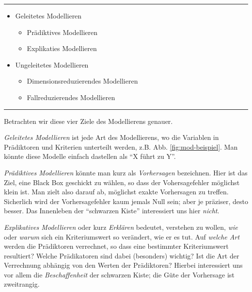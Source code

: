 \documentclass[12pt,ngerman,]{book}
\providecommand{\tightlist}{%
  \setlength{\itemsep}{0pt}\setlength{\parskip}{0pt}}
\theoremstyle{definition}
\theoremstyle{definition}
\theoremstyle{remark}
\begin{document}
\begin{center}\rule{0.5\linewidth}{\linethickness}\end{center}

\begin{itemize}
\tightlist
\item
  Geleitetes Modellieren

  \begin{itemize}
  \tightlist
  \item
    Prädiktives Modellieren
  \item
    Explikaties Modellieren
  \end{itemize}
\item
  Ungeleitetes Modellieren

  \begin{itemize}
  \tightlist
  \item
    Dimensionsreduzierendes Modellieren
  \item
    Fallreduzierendes Modellieren
  \end{itemize}
\end{itemize}

\begin{center}\rule{0.5\linewidth}{\linethickness}\end{center}

Betrachten wir diese vier Ziele des Modellierens genauer.

\emph{Geleitetes Modellieren} ist jede Art
des Modellierens, wo die Variablen in Prädiktoren und Kriterien
unterteilt werden, z.B. Abb. \ref{fig:mod-beispiel}. Man könnte diese
Modelle einfach dastellen als ``X führt zu Y''.

\emph{Prädiktives Modellieren} könnte man
kurz als \emph{Vorhersagen} bezeichnen. Hier ist das
Ziel, eine Black Box geschickt zu wählen, so dass der Vohersagefehler
möglichst klein ist. Man zielt also darauf ab, möglichst exakte
Vorhersagen zu treffen. Sicherlich wird der Vorhersagefehler kaum jemals
Null sein; aber je präziser, desto besser. Das Innenleben der
``schwarzen Kiste'' interessiert uns hier \emph{nicht}.

\emph{Explikatives Modellieren} oder
kurz \emph{Erklären} bedeutet, verstehen zu wollen,
\emph{wie} oder \emph{warum} sich ein Kriteriumswert so verändert, wie
er es tut. Auf \emph{welche Art} werden die Prädiktoren verrechnet, so
dass eine bestimmter Kriteriumswert resultiert? Welche Prädikatoren sind
dabei (besonders) wichtig? Ist die Art der Verrechnung abhängig von den
Werten der Prädiktoren? Hierbei interessiert uns vor allem die
\emph{Beschaffenheit} der schwarzen Kiste; die Güte der Vorhersage ist
zweitrangig.
\end{document}
